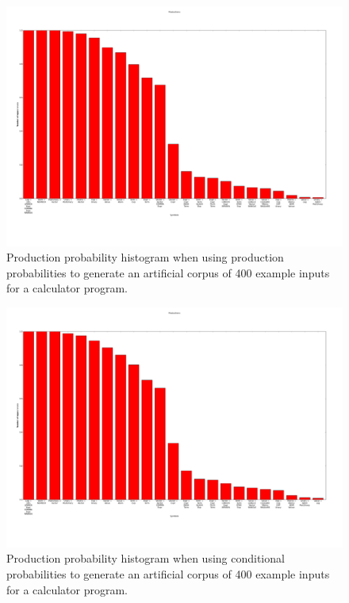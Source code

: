 \begin{figure}
    \begin{center}

\includegraphics[scale=0.2]{figs/gen/pp/production_probability_histogram.png}
    \end{center}
        \caption{Production probability histogram when using production
probabilities
to generate an artificial corpus of 400 example inputs for a calculator
program.}
    \label{times}
\end{figure}

\begin{figure}
    \begin{center}

\includegraphics[scale=0.2]{figs/gen/production_probability_histogram.png}
    \end{center}
        \caption{Production probability histogram when using conditional
probabilities to generate an artificial corpus of 400 example inputs for a
calculator program.}
    \label{times}
\end{figure}


